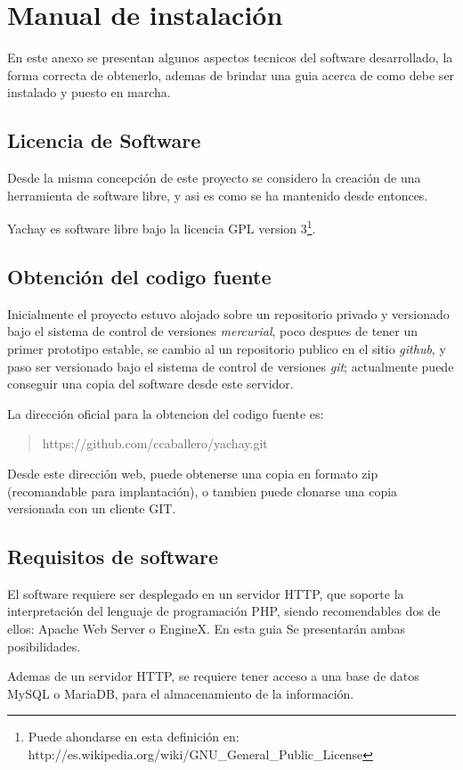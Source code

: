\chapter{Manual de instalación}
En este anexo se presentan algunos aspectos tecnicos del software desarrollado,
la forma correcta de obtenerlo, ademas de brindar una guia acerca de como debe
ser instalado y puesto en marcha.

\section{Licencia de Software}
Desde la misma concepción de este proyecto se considero la creación de una
herramienta de software libre, y asi es como se ha mantenido desde entonces.

Yachay es software libre bajo la licencia GPL version 3\footnote{Puede ahondarse
en esta definición en:
http://es.wikipedia.org/wiki/GNU\_General\_Public\_License}.

\section{Obtención del codigo fuente}
Inicialmente el proyecto estuvo alojado sobre un repositorio privado y
versionado bajo el sistema de control de versiones \emph{mercurial}, poco
despues de tener un primer prototipo estable, se cambio al un repositorio
publico en el sitio \emph{github}, y paso ser versionado bajo el sistema de
control de versiones \emph{git}; actualmente puede conseguir una copia del
software desde este servidor.

La dirección oficial para la obtencion del codigo fuente es:
\begin{quote}
https://github.com/ccaballero/yachay.git
\end{quote}

Desde este dirección web, puede obtenerse una copia en formato zip
(recomandable para implantación), o tambien puede clonarse una copia versionada
con un cliente GIT.

\section{Requisitos de software}
El software requiere ser desplegado en un servidor HTTP, que soporte la
interpretación del lenguaje de programación PHP, siendo recomendables dos de
ellos: Apache Web Server o EngineX. En esta guia Se presentarán ambas
posibilidades.

Ademas de un servidor HTTP, se requiere tener acceso a una base de datos MySQL o
MariaDB, para el almacenamiento de la información.

